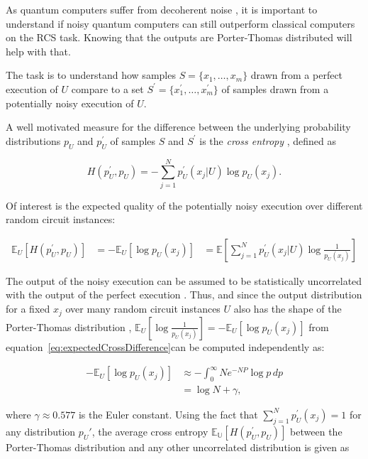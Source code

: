 As quantum computers suffer from decoherent noise \cite{Zeh:1970zz}, it is
important to understand if noisy quantum computers can still
outperform classical computers on the RCS task. Knowing that the outputs are
Porter-Thomas distributed will help with that.

The task is to understand how samples $S=\{x_1,\dots,x_m\}$ drawn from a perfect execution of
$U$ compare to a set $S^{\prime}=\{x_1^{\prime},\dots,x_m^{\prime}\}$ of samples drawn from a potentially noisy
execution of $U$.

A well motivated measure for the difference between the underlying
probability distributions $p_U$ and $p_U^{\prime}$ of samples $S$ and $S^{\prime}$ is the \textit{cross entropy} \cite{kullback1951}, defined as


\begin{equation}
  H(p_U^{\prime},p_U) = - \sum_{j=1}^Np_U^{\prime}(x_j|U) \log{p_U(x_j)}.
\end{equation}

Of interest is the expected quality of the potentially noisy execution over
different random circuit instances:

\begin{align}
  \label{eq:expectedCrossDifference}
  \mathbb{E}_U[H(p_U^{\prime},p_U)] &= -\mathbb{E}_U[\log{p_U(x_j)}]
                                    &= \mathbb{E} \left[\sum_{j=1}^Np_U^{\prime}(x_j|U)\log{\frac{1}{p_U(x_j)}}\right]
\end{align}

The output of the noisy execution can be assumed to
be statistically uncorrelated with the output of the perfect execution \cite{Boixo2018supremacy}. Thus,
and since the output distribution for a fixed $x_j$ over many random circuit
instances $U$ also has the shape of the Porter-Thomas distribution \cite{harrow2008random},
$\mathbb{E}_U[\log{\frac{1}{p_U(x_j)}}] = -\mathbb{E}_U[\log{p_U(x_j)}]$ from equation~\ref{eq:expectedCrossDifference}can be computed independently as:

\begin{align}
  -\mathbb{E}_U[\log{p_U(x_j)}] &\approx - \int_0^{\infty}Ne^{-NP}\log{p} \,dp \\
                                &= \log{N} + \gamma,
\end{align}

where $\gamma \approx 0.577$ is the Euler constant.
Using the fact that $\sum_{j=1}^Np_U^{\prime}(x_j) = 1$ for any distribution $p_U{\prime}$, the average cross
entropy $\mathbb{E_U}[H(p_U^{\prime},p_U)]$ between the Porter-Thomas distribution and any other uncorrelated distribution is
given as 

